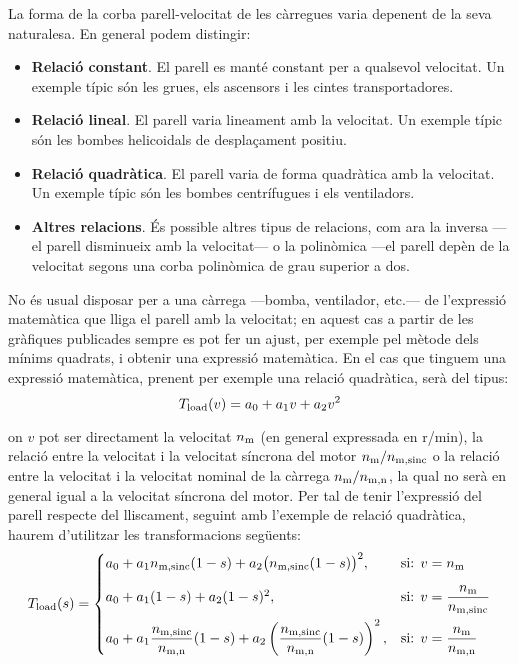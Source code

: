 La forma de la corba parell-velocitat de les càrregues varia depenent de la seva naturalesa. En general podem distingir:
\begin{itemize}
	\item  \textbf{Relació constant}. El parell es manté constant per a qualsevol velocitat. Un exemple típic són les grues, els ascensors i les cintes transportadores.
	
	\item  \textbf{Relació lineal}. El parell varia lineament amb la velocitat. Un exemple típic són les bombes helicoidals de desplaçament positiu.
	
	\item  \textbf{Relació quadràtica}. El parell varia de forma  quadràtica  amb la velocitat. Un exemple típic són les bombes centrífugues i els ventiladors.
	
	\item  \textbf{Altres relacions}. És possible altres tipus de relacions, com ara la inversa ---el parell disminueix amb la velocitat--- o la polinòmica ---el parell depèn de la velocitat segons una corba polinòmica de grau superior a dos.
\end{itemize}

No és  usual disposar per a una càrrega ---bomba, ventilador, etc.---   de l'expressió matemàtica que lliga el parell amb la velocitat; en aquest cas a partir de les gràfiques publicades sempre es pot fer un ajust, per exemple pel mètode dels mínims quadrats, i obtenir una expressió matemàtica. En el cas que tinguem una expressió matemàtica, prenent per exemple una relació quadràtica, serà del tipus:
\begin{equation}
	T_\mathrm{load}(v) = a_0 + a_1 v + a_2 v^2
\end{equation}

on $v$ pot ser directament la velocitat $n_\mathrm{m}$ (en general expressada en r/min),  la relació entre la velocitat i la velocitat síncrona del motor $n_\mathrm{m}/n_\mathrm{m,sinc}$ o la relació entre la velocitat i la velocitat nominal de la càrrega $n_\mathrm{m}/n_\mathrm{m,n}$, la qual no serà en general igual a la velocitat síncrona del motor. Per tal de tenir l'expressió del parell respecte del lliscament,  seguint amb l'exemple de relació quadràtica, haurem d'utilitzar les transformacions següents:
\begin{equation}\label{eq:Tload-v-s}
	T_\mathrm{load}(s) = \begin{cases}
		 a_0 + a_1 n_\mathrm{m,sinc}(1-s) + a_2 \big(n_\mathrm{m,sinc}(1-s)\big)^2,  & \text{si: } v=n_\mathrm{m}  \\[2ex]
		a_0 + a_1 (1-s) + a_2 (1-s)^2, &   
		\text{si: } v =\dfrac{n_\mathrm{m}}{n_\mathrm{m,sinc}} \\[2ex]
		 a_0 + a_1 \dfrac{n_\mathrm{m,sinc}}{n_\mathrm{m,n}}(1-s) + a_2 \left(\dfrac{n_\mathrm{m,sinc}}{n_\mathrm{m,n}}(1-s)\right)^2, &  \text{si: }  v = \dfrac{n_\mathrm{m}}{n_\mathrm{m,n}}
	\end{cases}
\end{equation}


